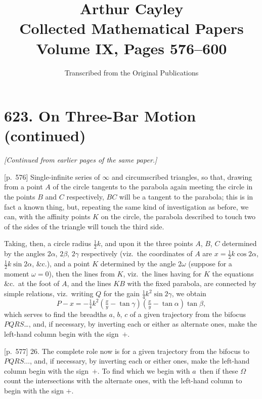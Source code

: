 \documentclass[11pt,a4paper]{article}
\title{\textbf{Arthur Cayley}\\\vspace{0.5em}
\Large Collected Mathematical Papers\\\vspace{0.3em}
\large Volume IX, Pages 576--600}
\author{Transcribed from the Original Publications}
\date{}
\theoremstyle{plain}
\theoremstyle{definition}
\theoremstyle{remark}
\begin{document}
\maketitle
\thispagestyle{empty}

\tableofcontents
\newpage

\section*{\textbf{623.} On Three-Bar Motion (continued)}

\textit{[Continued from earlier pages of the same paper.]}

\bigskip

[p.~576] Single-infinite series of $\infty$ and circumscribed triangles, so that, drawing from a point $A$ of the circle tangents to the parabola again meeting the circle in the points $B$ and $C$ respectively, $BC$ will be a tangent to the parabola; this is in fact a known thing, but, repeating the same kind of investigation as before, we can, with the affinity points $K$ on the circle, the parabola described to touch two of the sides of the triangle will touch the third side.

Taking, then, a circle radius $\frac{1}{2}k$, and upon it the three points $A$, $B$, $C$ determined by the angles $2\alpha$, $2\beta$, $2\gamma$ respectively (viz.\ the coordinates of $A$ are $x = \frac{1}{2}k\cos 2\alpha$, $\frac{1}{2}k\sin 2\alpha$, \&c.), and a point $K$ determined by the angle $2\omega$ (suppose for a moment $\omega = 0$), then the lines from $K$, viz.\ the lines having for $K$ the equations \&c.\ at the foot of $A$, and the lines $KB$ with the fixed parabola, are connected by simple relations, viz.\ writing $Q$ for the gain $\frac{1}{4}k^2 \sin 2\gamma$, we obtain
\[
P - x = -\tfrac{1}{4}k^2 \left( \tfrac{x}{y} - \tan \gamma \right) \left(\tfrac{x}{y} - \tan \alpha\right) \tan \beta,
\]
which serves to find the breadths $a$, $b$, $c$ of a given trajectory from the bifocus $PQRS$\ldots, and, if necessary, by inverting each or either as alternate ones, make the left-hand column begin with the sign~$+$.

[p.~577] 26. The complete role now is for a given trajectory from the bifocus to $PQRS\ldots$, and, if necessary, by inverting each or either ones, make the left-hand column begin with the sign~$+$. To find which we begin with $a$~then if these $\Omega$ count the intersections with the alternate ones, with the left-hand column to begin with the sign $+$.
\end{document}
